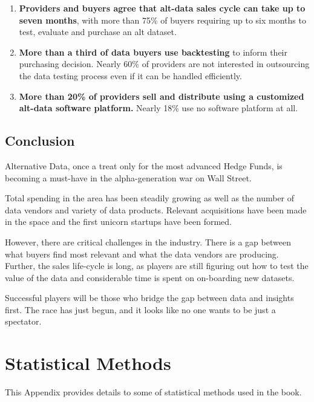 \documentclass[]{book}
\providecommand{\tightlist}{%
  \setlength{\itemsep}{0pt}\setlength{\parskip}{0pt}}
\theoremstyle{definition}
\theoremstyle{definition}
\theoremstyle{definition}
\theoremstyle{remark}
\begin{document}
\begin{enumerate}
\def\labelenumi{\arabic{enumi}.}
\tightlist
\item
  \textbf{Providers and buyers agree that alt-data sales cycle can take
  up to seven months}, with more than 75\% of buyers requiring up to six
  months to test, evaluate and purchase an alt dataset.
\item
  \textbf{More than a third of data buyers use backtesting} to inform
  their purchasing decision. Nearly 60\% of providers are not interested
  in outsourcing the data testing process even if it can be handled
  efficiently.
\item
  \textbf{More than 20\% of providers sell and distribute using a
  customized alt-data software platform.} Nearly 18\% use no software
  platform at all.
\end{enumerate}

\section{Conclusion}\label{conclusion-1}

Alternative Data, once a treat only for the most advanced Hedge Funds,
is becoming a must-have in the alpha-generation war on Wall Street.

Total spending in the area has been steadily growing as well as the
number of data vendors and variety of data products. Relevant
acquisitions have been made in the space and the first unicorn startups
have been formed.

However, there are critical challenges in the industry. There is a gap
between what buyers find most relevant and what the data vendors are
producing. Further, the sales life-cycle is long, as players are still
figuring out how to test the value of the data and considerable time is
spent on on-boarding new datasets.

Successful players will be those who bridge the gap between data and
insights first. The race has just begun, and it looks like no one wants
to be just a spectator.

\appendix {}


\chapter{Statistical Methods}\label{statistical-methods}

This Appendix provides details to some of statistical methods used in
the book.
\end{document}
